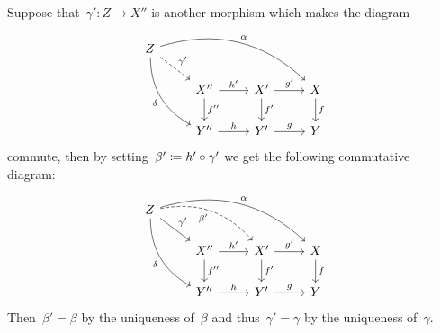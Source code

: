 Suppose that~$\gamma' \colon Z \to X''$ is another morphism which makes the diagram
\[
  \begin{tikzcd}
      Z
      \arrow[bend left]{drrr}[above right]{\alpha}
      \arrow[dashed]{dr}[above right]{\gamma'}
      \arrow[bend right]{ddr}[below left]{\delta}
    & {}
    & {}
    & {}
    \\
      {}
    & X''
      \arrow{r}[above]{h'}
      \arrow{d}[right]{f''}
    & X'
      \arrow{r}[above]{g'}
      \arrow{d}[right]{f'}
    & X
      \arrow{d}[right]{f}
    \\
      {}
    & Y''
      \arrow{r}[above]{h}
    & Y'
      \arrow{r}[above]{g}
    & Y
  \end{tikzcd}
\]
commute, then by setting~$\beta' \coloneqq h' \circ \gamma'$ we get the following commutative diagram:
\[
  \begin{tikzcd}
      Z
      \arrow[bend left]{drrr}[above right]{\alpha}
      \arrow[dashed, bend left]{drr}[below left]{\beta'}
      \arrow{dr}[above right]{\gamma'}
      \arrow[bend right]{ddr}[below left]{\delta}
    & {}
    & {}
    & {}
    \\
      {}
    & X''
      \arrow{r}[above]{h'}
      \arrow{d}[right]{f''}
    & X'
      \arrow{r}[above]{g'}
      \arrow{d}[right]{f'}
    & X
      \arrow{d}[right]{f}
    \\
      {}
    & Y''
      \arrow{r}[above]{h}
    & Y'
      \arrow{r}[above]{g}
    & Y
  \end{tikzcd}
\]
Then~$\beta' = \beta$ by the uniqueness of~$\beta$ and thus~$\gamma ' = \gamma$ by the uniqueness of~$\gamma$.





\subsection{}

